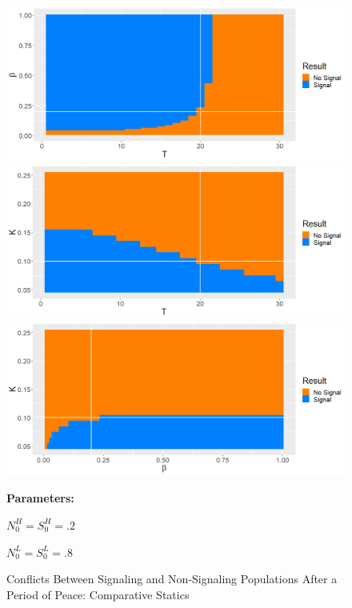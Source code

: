 \begin{figure}[p]
  \caption{Conflicts Between Signaling and Non-Signaling Populations After a Period of Peace: Comparative Statics}
   \label{fig:Regions}
    \includegraphics[width=\textwidth, height=.28\textheight]{Images/Region_BT.png}
    \includegraphics[width=\textwidth, height=.28\textheight]{Images/Region_KT.png}
    \includegraphics[width=\textwidth, height=.28\textheight]{Images/Region_KB.png}
 \begin{minipage}[c]{.2\textwidth}
    \textbf{Parameters:}
    \end{minipage}\hfill
    \begin{minipage}[c]{.2\textwidth}
    
    $N_0^H = S_0^H = .2$
    
    $N_0^L = S_0^L = .8$
    

\end{minipage}
\end{figure}
